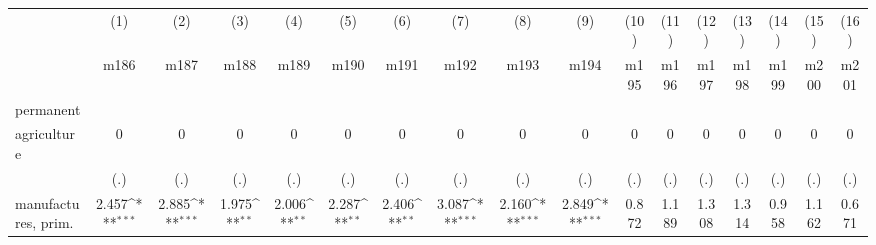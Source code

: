 {
\def\sym#1{\ifmmode^{#1}\else\(^{#1}\)\fi}
\begin{tabular}{l*{16}{c}}
\hline\hline
                    &\multicolumn{1}{c}{(1)}&\multicolumn{1}{c}{(2)}&\multicolumn{1}{c}{(3)}&\multicolumn{1}{c}{(4)}&\multicolumn{1}{c}{(5)}&\multicolumn{1}{c}{(6)}&\multicolumn{1}{c}{(7)}&\multicolumn{1}{c}{(8)}&\multicolumn{1}{c}{(9)}&\multicolumn{1}{c}{(10)}&\multicolumn{1}{c}{(11)}&\multicolumn{1}{c}{(12)}&\multicolumn{1}{c}{(13)}&\multicolumn{1}{c}{(14)}&\multicolumn{1}{c}{(15)}&\multicolumn{1}{c}{(16)}\\
                    &\multicolumn{1}{c}{m186}&\multicolumn{1}{c}{m187}&\multicolumn{1}{c}{m188}&\multicolumn{1}{c}{m189}&\multicolumn{1}{c}{m190}&\multicolumn{1}{c}{m191}&\multicolumn{1}{c}{m192}&\multicolumn{1}{c}{m193}&\multicolumn{1}{c}{m194}&\multicolumn{1}{c}{m195}&\multicolumn{1}{c}{m196}&\multicolumn{1}{c}{m197}&\multicolumn{1}{c}{m198}&\multicolumn{1}{c}{m199}&\multicolumn{1}{c}{m200}&\multicolumn{1}{c}{m201}\\
\hline
permanent           &                     &                     &                     &                     &                     &                     &                     &                     &                     &                     &                     &                     &                     &                     &                     &                     \\
agriculture         &           0         &           0         &           0         &           0         &           0         &           0         &           0         &           0         &           0         &           0         &           0         &           0         &           0         &           0         &           0         &           0         \\
                    &         (.)         &         (.)         &         (.)         &         (.)         &         (.)         &         (.)         &         (.)         &         (.)         &         (.)         &         (.)         &         (.)         &         (.)         &         (.)         &         (.)         &         (.)         &         (.)         \\
[1em]
manufactures, prim. &       2.457\sym{***}&       2.885\sym{***}&       1.975\sym{**} &       2.006\sym{**} &       2.287\sym{**} &       2.406\sym{**} &       3.087\sym{***}&       2.160\sym{***}&       2.849\sym{***}&       0.872         &       1.189         &       1.308         &       1.314         &       0.958         &       1.162         &       0.671         \\

\end{tabular}}
